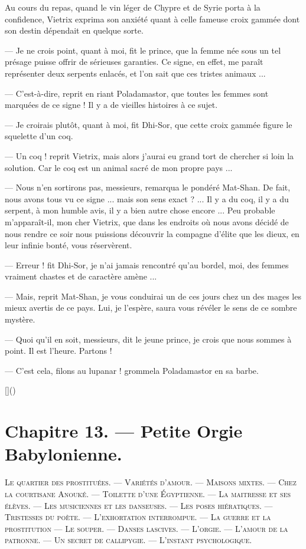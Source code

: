 \documentclass[a4paper, 11pt, oneside, polutonikogreek, french]{article}
\begin{document}
\bigskip
\centerline{\EightStarTaper}
\centerline{\EightStarTaper\EightStarTaper}
\bigskip

Au cours du repas, quand le vin léger de Chypre et de Syrie porta à la confidence, Vietrix exprima son anxiété quant à celle fameuse croix gammée dont son destin dépendait en quelque sorte.

--- Je ne crois point, quant à moi, fit le prince, que la femme née sous un tel présage puisse offrir de sérieuses garanties. Ce signe, en effet, me paraît représenter deux serpents enlacés, et l'on sait que ces tristes animaux ...

--- C'est-à-dire, reprit en riant Poladamastor, que toutes les femmes sont marquées de ce signe ! Il y a de vieilles histoires à ce sujet.

--- Je croirais plutôt, quant à moi, fit Dhi-Sor, que cette croix gammée figure le squelette d'un coq.

--- Un coq ! reprit Vietrix, mais alors j'aurai eu grand tort de chercher si loin la solution. Car le coq est un animal sacré de mon propre pays ...

--- Nous n'en sortirons pas, messieurs, remarqua le pondéré Mat-Shan. De fait, nous avons tous vu ce signe ... mais son sens exact ? ... Il y a du coq, il y a du serpent, à mon humble avis, il y a bien autre chose encore ... Peu probable m'apparaît-il, mon cher Vietrix, que dans les endroits où nous avons décidé de nous rendre ce soir nous puissions découvrir la compagne d'élite que les dieux, en leur infinie bonté, vous réservèrent.

--- Erreur ! fit Dhi-Sor, je n'ai jamais rencontré qu'au bordel, moi, des femmes vraiment chastes et de caractère amène ...

--- Mais, reprit Mat-Shan, je vous conduirai un de ces jours chez un des mages les mieux avertis de ce pays. Lui, je l'espère, saura vous révéler le sens de ce sombre mystère.

--- Quoi qu'il en soit, messieurs, dit le jeune prince, je crois que nous sommes à point. Il est l'heure. Partons !

--- C'est cela, filons au lupanar ! grommela Poladamastor en sa barbe.

[]()
\clearpage
\section{Chapitre 13. --- Petite Orgie Babylonienne.}
\begin{center}
\scshape
\small
Le quartier des prostituées. --- Variétés d'amour. --- Maisons mixtes. --- Chez la courtisane Anouké. --- Toilette d'une Égyptienne. --- La maitresse et ses élèves. --- Les musiciennes et les danseuses. --- Les poses hiératiques. --- Tristesses du poète. --- L'exhortation interrompue. --- La guerre et la prostitution --- Le souper. --- Danses lascives. --- L'orgie. --- L'amour de la patronne. --- Un secret de callipygie. --- L'instant psychologique.
\end{center}
\end{document}
